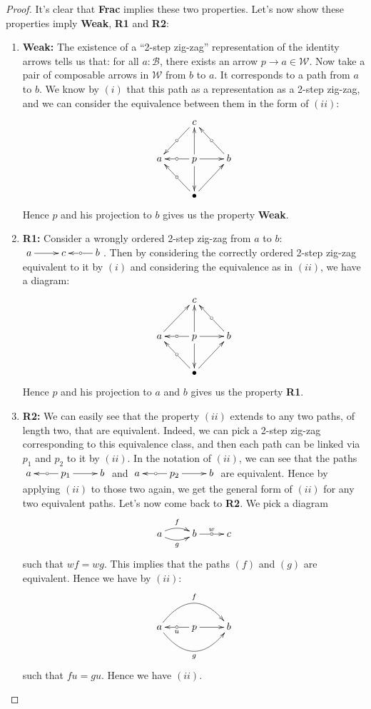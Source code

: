 \documentclass{article}
\numberwithin{equation}{section}
\theoremstyle{definition}
\theoremstyle{plain}
\begin{document}
\begin{proof}
	It's clear that \textbf{Frac} implies these two properties. Let's now show these properties imply \textbf{Weak}, \textbf{R1} and \textbf{R2}:
	\begin{enumerate}[label = $\bullet$]
		\item \textbf{Weak:} The existence of a ``2-step zig-zag'' representation of the identity arrows tells us that: for all $a:\mathcal{B}$, there exists an arrow $p \to a \in \mathcal{W}$. Now take a pair of composable arrows in $\mathcal{W}$ from $b$ to $a$. It corresponds to a path from $a$ to $b$. We know by $(i)$ that this path as a representation as a 2-step zig-zag, and we can consider the equivalence between them in the form of $(ii)$:
		\[\xymatrix{
			& c \ar[dl]|{\circ} \\
			a  & p \ar[l]|{\circ}\ar[u]\ar[r]\ar[d] & b \ar[ul]|{\circ}\\
			& \bullet \ar[ul]|{\circ} \ar[ur]
		}\]
		Hence $p$ and his projection to $b$ gives us the property \textbf{Weak}.
		\item \textbf{R1:} Consider a wrongly ordered 2-step zig-zag from $a$ to $b$: $\xymatrix{a \ar[r] & c & b \ar[l]|{\circ}}$. Then by considering the correctly ordered 2-step zig-zag equivalent to it by $(i)$ and considering the equivalence as in $(ii)$, we have a diagram:
		\[\xymatrix{
			& c \\
			a \ar[ur]  & p \ar[l]|{\circ}\ar[u]\ar[r]\ar[d] & b \ar[ul]|{\circ}\\
			& \bullet \ar[ul]|{\circ} \ar[ur]
		}\]
		Hence $p$ and his projection to $a$ and $b$ gives us the property \textbf{R1}.
		\item \textbf{R2:} We can easily see that the property $(ii)$ extends to any two paths, of length two, that are equivalent. Indeed, we can pick a 2-step zig-zag corresponding to this equivalence class, and then each path can be linked via $p_1$ and $p_2$ to it by $(ii)$. In the notation of $(ii)$, we can see that the paths $\xymatrix{a & p_1 \ar[l]|{\circ} \ar[r] & b}$ and $\xymatrix{a & p_2 \ar[l]|{\circ} \ar[r] & b}$ are equivalent. Hence by applying $(ii)$ to those two again, we get the general form of $(ii)$ for any two equivalent paths. Let's now come back to \textbf{R2}. We pick a diagram
		\[\xymatrix{
			a \ar@/^/[r]^f \ar@/_/[r]_g & b \ar[r]^w|{\circ} & c
		}\]
		such that $wf = wg$. This implies that the paths $(f)$ and $(g)$ are equivalent. Hence we have by $(ii)$:
		\[\xymatrix{
			a \ar@/^2pc/[rr]^f \ar@/_2pc/[rr]_g & p \ar[l]|{\circ}^u \ar[r] & b
		}\]
		such that $fu = gu$. Hence we have $(ii)$.
	\end{enumerate}
\end{proof}
\end{document}

